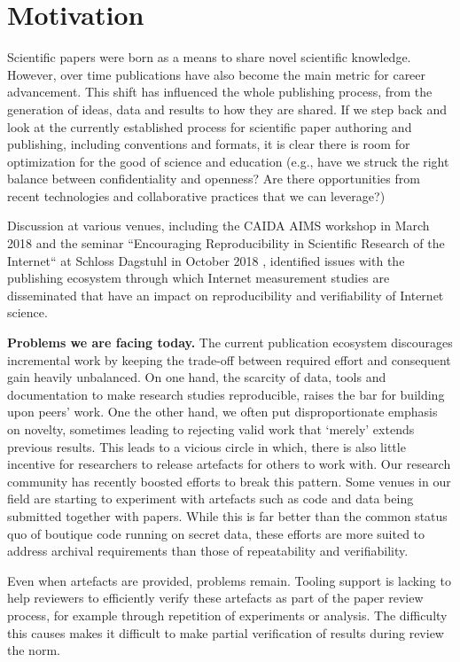\documentclass[sigconf,10pt]{acmart}
\begin{document}
\section{Motivation}
\label{sec:intro}

Scientific papers were born as a means to share novel scientific knowledge.
However, over time publications have also become the main metric for career
advancement. This shift has influenced the whole publishing process, from the
generation of ideas, data and results to how they are shared. If we step back
and look at the currently established process for scientific paper authoring and
publishing, including conventions and formats, it is clear there is room for
optimization for the good of science and education (e.g.,  have we struck the
right balance between confidentiality and openness? Are there opportunities from
recent technologies and collaborative practices that we can leverage?)

Discussion at various venues, including the CAIDA AIMS workshop in March 2018
\cite{aims-presentation} and the seminar ``Encouraging Reproducibility in
Scientific Research of the Internet`` at Schloss Dagstuhl in October 2018
\cite{dagstuhl-site}, identified issues with the publishing ecosystem through
which Internet measurement studies are disseminated that have an impact on
reproducibility and verifiability of Internet science.

\textbf{Problems we are facing today.} The current publication ecosystem
discourages incremental work by keeping the trade-off between required effort
and consequent gain heavily unbalanced.  On one hand, the scarcity of data,
tools and documentation to make research studies reproducible, raises the bar
for building upon peers' work.  One the other hand, we often put
disproportionate emphasis on novelty, sometimes leading to rejecting valid work
that `merely' extends previous results.  This leads to a vicious circle in
which, there is also little incentive for researchers to release artefacts for
others to work with.  Our research community has recently boosted efforts to
break this pattern.  Some venues in our field are starting to experiment with
artefacts such as code and data being submitted together with papers. While this
is far better than the common status quo of boutique code running on secret
data, these efforts are more suited to address archival requirements than those
of repeatability and verifiability. 

Even when artefacts are provided, problems remain. Tooling support is lacking
to help reviewers to efficiently verify these artefacts as part of the paper
review process, for example through repetition of experiments or analysis. The
difficulty this causes makes it difficult to make partial verification of
results during review the norm.
\end{document}
